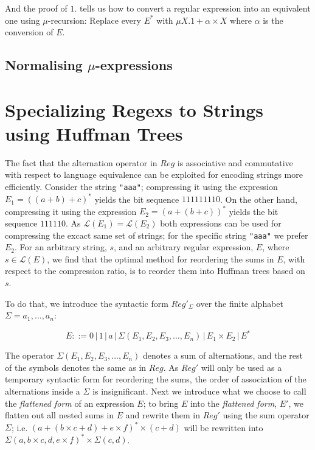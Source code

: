 \documentclass[a4paper, oneside]{memoir}
\theoremstyle{definition}
\begin{document}
And the proof of $1.$ tells us how to convert a regular expression into an
equivalent one using $\mu$-recursion: Replace every $E^{\ast}$ with $\mu X.1 +
\alpha \times X$ where $\alpha$ is the conversion of $E$.

\subsection{Normalising $\mu$-expressions}

\section{Specializing Regexs to Strings using Huffman Trees}

The fact that the alternation operator in $Reg$ is associative and commutative with respect to language equivalence can be exploited for encoding strings more efficiently. Consider the string \texttt{"aaa"}; compressing it using the expression $E_1 = ((a + b) + c)^{*}$ yields the bit sequence $111111110$. On the other hand, compressing it using the expression $E_2 = (a + (b + c))^{*}$ yields the bit sequence $111110$. As $\mathcal{L}(E_1) = \mathcal{L}(E_2)$ both expressions can be used for compressing the excact same set of strings; for the specific string \texttt{"aaa"} we prefer $E_2$. For an arbitrary string, $s$, and an arbitrary regular expression, $E$, where $s \in \mathcal{L}(E)$, we find that the optimal method for reordering the sums in $E$, with respect to the compression ratio, is to reorder them into Huffman trees based on $s$. 

To do that, we introduce the syntactic form $Reg'_\Sigma$ over the finite alphabet $\Sigma = {a_1, \dots, a_n}$:

\[
    E ::= 0 \, | \, 1 \, | \, a \, | \, \Sigma(E_1, E_2, E_3, \dots, E_n) \, | \, E_1 \times E_2 \, | \, E^{*}
\]

The operator $\Sigma(E_1, E_2, E_3, \dots, E_n)$ denotes a sum of alternations, and the rest of the symbols denotes the same as in $Reg$. As $Reg'$ will only be used as a temporary syntactic form for reordering the sums, the order of association of the alternations inside a $\Sigma$ is insignificant.
Next we introduce what we choose to call the \emph{flattened form} of an expression $E$; to bring $E$ into the \emph{flattened form}, $E'$, we flatten out all nested sums in $E$ and rewrite them in $Reg'$ using the sum operator $\Sigma$; i.e. $(a + (b \times c + d) + e \times f)^{*} \times (c + d)$ will be rewritten into $\Sigma(a, b \times c, d, e \times f)^{*} \times \Sigma{(c, d)}$.
\end{document}
